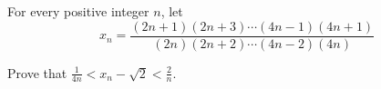 For every positive integer $n$,  let\[x_n=\frac{(2n+1)(2n+3)\cdots (4n-1)(4n+1)}{(2n)(2n+2)\cdots (4n-2)(4n)}\]

Prove that $\frac{1}{4n}<x_n-\sqrt{2}<\frac{2}{n}$.